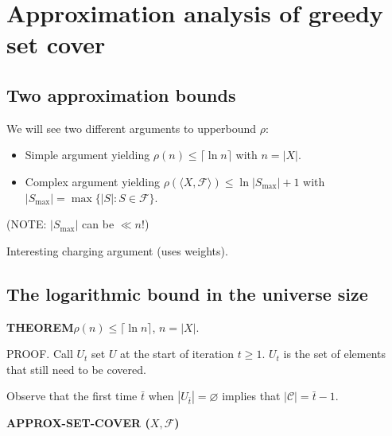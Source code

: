 \section{Approximation analysis of greedy set cover}
\subsection{Two approximation bounds}
We will see two different arguments to upperbound $\rho$:
\begin{itemize}
\item Simple argument yielding $\rho(n)\leq\lceil\ln n\rceil$ with $n=|X|$.
\item Complex argument yielding $\rho(\langle X,\mathcal F\rangle)\leq\ln|S_{\max}|+1$ with
$|S_{\max}|=\max\{|S|:S\in\mathcal F\}$.
\end{itemize}
(NOTE: $|S_{\max}|$ can be $\ll n$!)

Interesting charging argument (uses weights).

\subsection{The logarithmic bound in the universe size}
\begin{notestheorem}
\textbf{THEOREM}\quad $\rho(n)\leq\lceil\ln n\rceil$, $n=|X|$.
\end{notestheorem}
PROOF. Call $U_t$ set $U$ at the start of iteration $t\geq1$. $U_t$ is the set of elements that still need to be covered.

Observe that the first time $\bar t$ when $|U_{\bar t}|=\varnothing$ implies that $|\mathcal C|=\bar t-1$.
\begin{notesalgorithm}
\textbf{APPROX-SET-COVER ($X,\mathcal F$)}
\begin{notespseudocode}
\end{notespseudocode}
\end{notesalgorithm}
